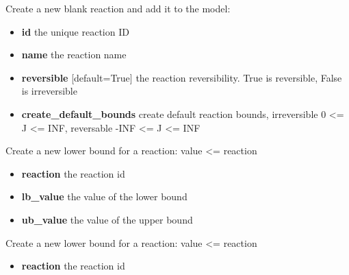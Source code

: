\documentclass[a4paper,11pt,english]{sphinxmanual}
\begin{document}
\begin{fulllineitems}

\begin{fulllineitems}
\label{modules_doc:cbmpy.CBModel.Model.createReaction}
Create a new blank reaction and add it to the model:
\begin{itemize}
\item {} 
\textbf{id} the unique reaction ID

\item {} 
\textbf{name} the reaction name

\item {} 
\textbf{reversible} {[}default=True{]} the reaction reversibility. True is reversible, False is irreversible

\item {} 
\textbf{create\_default\_bounds} create default reaction bounds, irreversible 0 \textless{}= J \textless{}= INF, reversable -INF \textless{}= J \textless{}= INF

\end{itemize}

\end{fulllineitems}


\begin{fulllineitems}
\label{modules_doc:cbmpy.CBModel.Model.createReactionBounds}
Create a new lower bound for a reaction: value \textless{}= reaction
\begin{itemize}
\item {} 
\textbf{reaction} the reaction id

\item {} 
\textbf{lb\_value} the value of the lower bound

\item {} 
\textbf{ub\_value} the value of the upper bound

\end{itemize}

\end{fulllineitems}


\begin{fulllineitems}
\label{modules_doc:cbmpy.CBModel.Model.createReactionLowerBound}
Create a new lower bound for a reaction: value \textless{}= reaction
\begin{itemize}
\item {} 
\textbf{reaction} the reaction id


\end{itemize}
\end{fulllineitems}
\end{fulllineitems}
\end{document}
